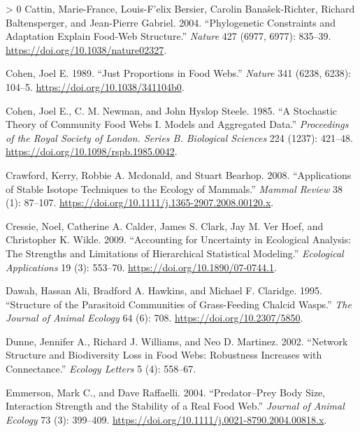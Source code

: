 \documentclass{article}
\newlength{\cslhangindent}
\newenvironment{CSLReferences}[3] %
 {%
  \setlength{\parindent}{0pt}
  \ifodd #1 \everypar{\setlength{\hangindent}{\cslhangindent}}\ignorespaces\fi
  \ifnum #2 > 0
  \setlength{\parskip}{#2\baselineskip}
  \fi
 }%
 {}
\begin{document}
\begin{CSLReferences}{1}{0}
\leavevmode\hypertarget{ref-cattinPhylogeneticConstraintsAdaptation2004}{}%
Cattin, Marie-France, Louis-F'elix Bersier, Carolin Banašek-Richter,
Richard Baltensperger, and Jean-Pierre Gabriel. 2004. {``Phylogenetic
Constraints and Adaptation Explain Food-Web Structure.''} \emph{Nature}
427 (6977, 6977): 835--39. \url{https://doi.org/10.1038/nature02327}.

\leavevmode\hypertarget{ref-cohenJustProportionsFood1989}{}%
Cohen, Joel E. 1989. {``Just Proportions in Food Webs.''} \emph{Nature}
341 (6238, 6238): 104--5. \url{https://doi.org/10.1038/341104b0}.

\leavevmode\hypertarget{ref-cohenStochasticTheoryCommunity1985}{}%
Cohen, Joel E., C. M. Newman, and John Hyslop Steele. 1985. {``A
Stochastic Theory of Community Food Webs {I}. {Models} and Aggregated
Data.''} \emph{Proceedings of the Royal Society of London. Series B.
Biological Sciences} 224 (1237): 421--48.
\url{https://doi.org/10.1098/rspb.1985.0042}.

\leavevmode\hypertarget{ref-crawfordApplicationsStableIsotope2008}{}%
Crawford, Kerry, Robbie A. Mcdonald, and Stuart Bearhop. 2008.
{``Applications of Stable Isotope Techniques to the Ecology of
Mammals.''} \emph{Mammal Review} 38 (1): 87--107.
\url{https://doi.org/10.1111/j.1365-2907.2008.00120.x}.

\leavevmode\hypertarget{ref-cressieAccountingUncertaintyEcological2009}{}%
Cressie, Noel, Catherine A. Calder, James S. Clark, Jay M. Ver Hoef, and
Christopher K. Wikle. 2009. {``Accounting for Uncertainty in Ecological
Analysis: The Strengths and Limitations of Hierarchical Statistical
Modeling.''} \emph{Ecological Applications} 19 (3): 553--70.
\url{https://doi.org/10.1890/07-0744.1}.

\leavevmode\hypertarget{ref-dawahStructureParasitoidCommunities1995}{}%
Dawah, Hassan Ali, Bradford A. Hawkins, and Michael F. Claridge. 1995.
{``Structure of the {Parasitoid Communities} of {Grass}-{Feeding Chalcid
Wasps}.''} \emph{The Journal of Animal Ecology} 64 (6): 708.
\url{https://doi.org/10.2307/5850}.

\leavevmode\hypertarget{ref-dunneNetworkStructureBiodiversity}{}%
Dunne, Jennifer A., Richard J. Williams, and Neo D. Martinez. 2002.
{``Network Structure and Biodiversity Loss in Food Webs: Robustness
Increases with Connectance.''} \emph{Ecology Letters} 5 (4): 558--67.

\leavevmode\hypertarget{ref-emmersonPredatorPreyBody2004}{}%
Emmerson, Mark C., and Dave Raffaelli. 2004. {``Predator--Prey Body
Size, Interaction Strength and the Stability of a Real Food Web.''}
\emph{Journal of Animal Ecology} 73 (3): 399--409.
\url{https://doi.org/10.1111/j.0021-8790.2004.00818.x}.


\end{CSLReferences}
\end{document}
